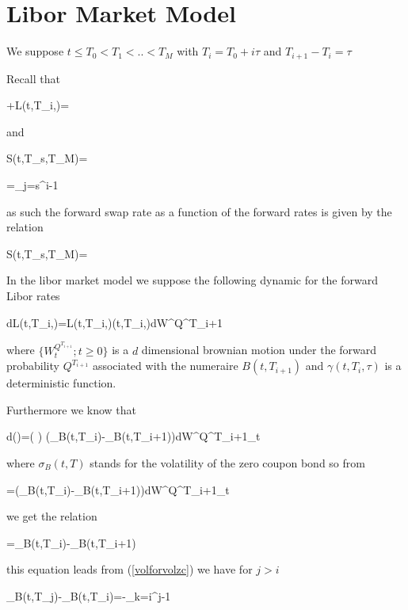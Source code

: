 
\section{Libor Market Model}


We suppose  $t \leq T_0 < T_1 <..<T_M $ with  $T_i=T_0+i \tau$ and  $T_{i+1}-T_i=\tau $ 
 

Recall that 

+\tau L(t,T_i,\tau)= 
\ean

and

\ban
S(t,T_s,T_M)=
\ean

\ban
{}=\prod_{j=s}^{i-1}
\ean

as such the forward swap rate as a function of the forward rates is given by the relation

\ba
S(t,T_s,T_M)= \label{tswaptfor}
\ea

In the libor market model we suppose the following dynamic for the forward Libor rates


\ban
dL(t,T_i,\tau)=L(t,T_i,\tau)\gamma(t,T_i,\tau)dW^{Q^{T_{i+1}}}
\ean

where $\lbrace W^{Q^{T_{i+1}}}_t; t\geq 0 \rbrace$ is a $d$ dimensional brownian motion under the forward probability $Q^{T_{i+1}}$ associated with the numeraire $B(t,T_{i+1})$ and  $\gamma(t,T_i,\tau)$ is a deterministic function. 

Furthermore we know that 

\ban
d\left(\right)=\left(  \right) (\sigma_B(t,T_i)-\sigma_B(t,T_{i+1}))dW^{Q^{T_{i+1}}}_t
\ean

where $\sigma_B(t,T)$ stands for the volatility of the zero coupon bond so from 

\ban
{}=(\sigma_B(t,T_i)-\sigma_B(t,T_{i+1}))dW^{Q^{T_{i+1}}}_t
\ean

we get the relation

\ba
{}=\sigma_B(t,T_i)-\sigma_B(t,T_{i+1}) \label{volforvolzc}
\ea


this equation leads  from  (\ref{volforvolzc}) we have for  $j>i$

\ban
\sigma_B(t,T_j)-\sigma_B(t,T_i)=-\sum_{k=i}^{j-1}
\ean

